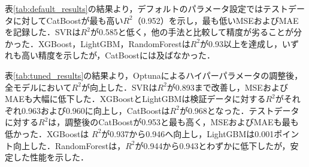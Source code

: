 表\ref{tab:default_results}の結果より，デフォルトのパラメータ設定ではテストデータに対してCatBoostが最も高い$R^2$（0.952）を示し，最も低いMSEおよびMAEを記録した．SVRは$R^2$が0.585と低く，他の手法と比較して精度が劣ることが分かった．XGBoost，LightGBM，RandomForestは$R^2$が0.93以上を達成し，いずれも高い精度を示したが，CatBoostには及ばなかった．

表\ref{tab:tuned_results}の結果より，Optunaによるハイパーパラメータの調整後，全モデルにおいて$R^2$が向上した．SVRは$R^2$が0.893まで改善し，MSEおよびMAEも大幅に低下した．XGBoostとLightGBMは検証データに対する$R^2$がそれぞれ0.963および0.960に向上し，CatBoostは$R^2$が0.968となった．テストデータに対する$R^2$は，調整後のCatBoostが0.953と最も高く，MSEおよびMAEも最も低かった．XGBoostは $R^2$が0.937から0.946へ向上し，LightGBMは0.001ポイント向上した．RandomForestは，$R^2$が0.944から0.943とわずかに低下したが，安定した性能を示した．

